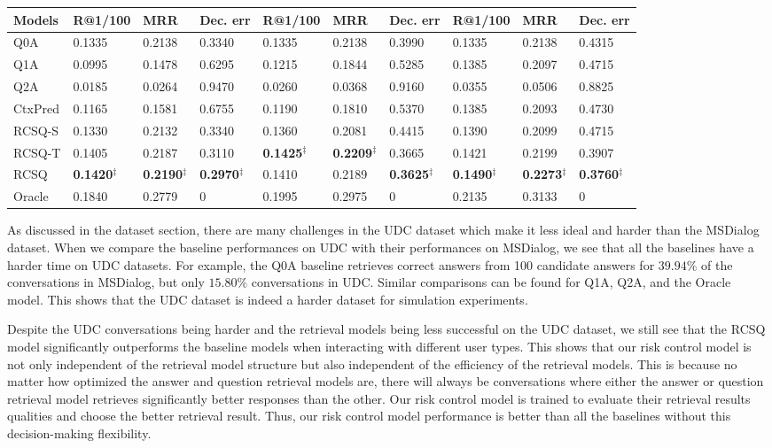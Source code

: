 \documentclass[format=acmsmall, review=False, screen=true]{acmart}
\begin{document}
\begin{table}[t]
{\begin{tabular}{l|l|l|l|l|l|l|l|l|l}
Models  & R@1/100     & MRR    & Dec. err    & R@1/100     & MRR    & Dec. err    & R@1/100     & MRR    & Dec. err  \\ \hline
Q0A     & 0.1335    & 0.2138    & 0.3340    & 0.1335    & 0.2138    & 0.3990     & 0.1335    & 0.2138    & 0.4315   \\ 
Q1A     & 0.0995    & 0.1478    & 0.6295    & 0.1215    & 0.1844   &  0.5285  & 0.1385    & 0.2097    & 0.4715   \\ 
Q2A     & 0.0185  & 0.0264  & 0.9470  & 0.0260  & 0.0368  & 0.9160  &  0.0355 & 0.0506  & 0.8825     \\ 
CtxPred & 0.1165  & 0.1581  & 0.6755  & 0.1190   & 0.1810   & 0.5370 & 0.1385    & 0.2093 & 0.4730       \\ \hline
RCSQ-S    & 0.1330   & 0.2132   & 0.3340 & 0.1360  & 0.2081 & 0.4415 & 0.1390 & 0.2099 & 0.4715 \\ 
RCSQ-T    &  0.1405   & 0.2187 & 0.3110   & \textbf{0.1425}$^{\ddag}$  & \textbf{0.2209}$^{\ddag}$  & 0.3665& 0.1421 & 0.2199  & 0.3907   \\
RCSQ    &  \textbf{0.1420}$^{\ddag}$   & \textbf{0.2190}$^{\ddag}$   & \textbf{0.2970}$^{\ddag}$  &  0.1410 &  0.2189 &  \textbf{0.3625}$^{\ddag}$ & \textbf{0.1490}$^{\ddag}$   & \textbf{0.2273}$^{\ddag}$  & \textbf{0.3760}$^{\ddag}$\\ \hline
Oracle  & 0.1840    & 0.2779    & 0  &   0.1995  &   0.2975     & 0    & 0.2135   & 0.3133 & 0   \\ 
\hline\hline
\end{tabular}
}
\label{udcbi}
\end{table}

As discussed in the dataset section, there are many challenges in the UDC dataset which make it less ideal and harder than the MSDialog dataset. When we compare the baseline performances on UDC with their performances on MSDialog, we see that all the baselines have a harder time on UDC datasets. For example, the Q0A baseline retrieves correct answers from 100 candidate answers for $39.94\%$ of the conversations in MSDialog, but only $15.80\%$ conversations in UDC. Similar comparisons can be found for Q1A, Q2A, and the Oracle model. This shows that the UDC dataset is indeed a harder dataset for simulation experiments.

Despite the UDC conversations being harder and the retrieval models being less successful on the UDC dataset, we still see that the RCSQ model significantly outperforms the baseline models when interacting with different user types. This shows that our risk control model is not only independent of the retrieval model structure but also independent of the efficiency of the retrieval models. This is because no matter how optimized the answer and question retrieval models are, there will always be conversations where either the answer or question retrieval model retrieves significantly better responses than the other. Our risk control model is trained to evaluate their retrieval results qualities and choose the better retrieval result. Thus, our risk control model performance is better than all the baselines without this decision-making flexibility. 
\end{document}
